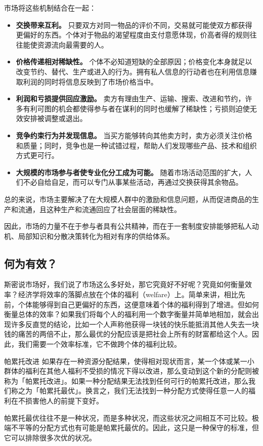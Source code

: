 \documentclass[UTF8,10pt,a4paper,scheme=chinese,fontset=none]{ctexart}
\begin{document}
市场将这些机制结合在一起：
\begin{itemize}
  \item \textbf{交换带来互利。} 只要双方对同一物品的评价不同，交易就可能使双方都获得更偏好的东西。个体对于物品的渴望程度由支付意愿体现，价高者得的规则往往能使资源流向最需要的人。
  \item \textbf{价格传递相对稀缺性。} 个体不必知道短缺的全部原因；价格变化本身就足以改变节约、替代、生产或进入的行为。拥有私人信息的行动者也在利用信息赚取利润的同时将信息反映到了市场价格当中。
  \item \textbf{利润和亏损提供回应激励。} 卖方有理由生产、运输、搜索、改进和节约，许多有利可图的机会都使得参与者在谋利的同时也缓解了稀缺性；亏损则迫使无效安排被调整或退出。
  \item \textbf{竞争约束行为并发现信息。} 当买方能够转向其他卖方时，卖方必须关注价格和质量；同时，竞争也是一种试错过程，帮助人们发现哪些产品、技术和组织方式更可行。
  \item \textbf{大规模的市场参与者使专业化分工成为可能。} 随着市场活动范围的扩大，人们不必自给自足，而可以专门从事某些活动，再通过交换获得其余物品。
\end{itemize}

总的来说，市场主要解决了在大规模人群中的激励和信息问题，从而促进商品的生产和流通，且这种生产和流通回应了社会层面的稀缺性。

因此，市场的力量不在于参与者具有公共精神，而在于一套制度安排能够把私人动机、局部知识和分散决策转化为相对有序的供给体系。

\subsection{何为有效？}
斯密说市场好，我们说了市场这么多好处，那它究竟好不好呢？究竟如何衡量效率？经济学将效率的落脚点放在个体的福利（welfare）上。简单来讲，相比先前，个体能够得到自己更偏好的东西，这便意味着个体的福利得到了增进。但如何衡量总体的效率？如果我们将每个人的福利用一个数字衡量并简单地相加，就会出现许多反直觉的结论，比如一个人声称他获得一块钱的快乐能抵消其他人失去一块钱的痛苦的两倍不止，那么最优的分配应该是把社会上所有的财富都给这个人。因此，我们需要一个效率标准，它不做跨个体的福利比较。
\begin{conceptbox}{帕累托改进}
如果存在一种资源分配结果，使得相对现状而言，某一个体或某一小群体的福利在其他人福利不受损的情况下得以改进，那么变动到这个新的分配则被称为「帕累托改进」。如果一种分配结果无法找到任何可行的帕累托改进，那么我们称之为「帕累托最优」。换言之，我们无法找到一种分配方式使得任意一人的福利在不损害他人的前提下变好。

帕累托最优往往不是一种状况，而是多种状况，而这些状况之间相互不可比较。极端不平等的分配方式也有可能是帕累托最优的。因此，这只是一种保守的标准，但它可以排除很多次优的状况。
\end{conceptbox}
\end{document}
